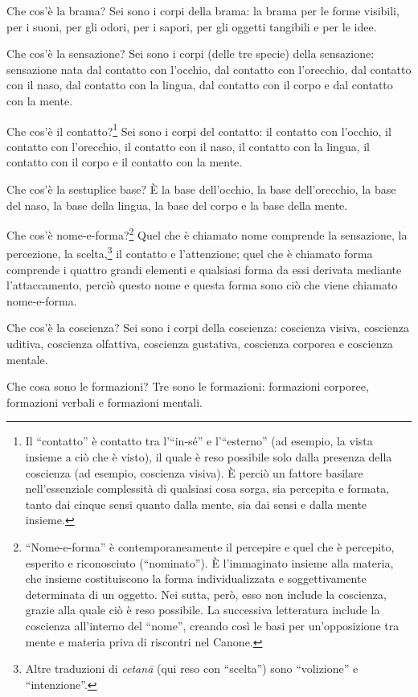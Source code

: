 Che cos’è la brama? Sei sono i corpi della brama: la brama per le forme
visibili, per i suoni, per gli odori, per i sapori, per gli oggetti tangibili e
per le idee.

Che cos’è la sensazione? Sei sono i corpi (delle tre specie) della sensazione:
sensazione nata dal contatto con l’occhio, dal contatto con l’orecchio, dal
contatto con il naso, dal contatto con la lingua, dal contatto con il corpo e
dal contatto con la mente.

Che cos’è il contatto?\footnote{Il “contatto” è contatto tra l’“in-sé” e
  l’“esterno” (ad esempio, la vista insieme a ciò che è visto), il quale è reso
  possibile solo dalla presenza della coscienza (ad esempio, coscienza visiva).
  È perciò un fattore basilare nell’essenziale complessità di qualsiasi cosa
  sorga, sia percepita e formata, tanto dai cinque sensi quanto dalla mente, sia
  dai sensi e dalla mente insieme.} Sei sono i corpi del contatto: il contatto
con l’occhio, il contatto con l’orecchio, il contatto con il naso, il contatto
con la lingua, il contatto con il corpo e il contatto con la mente.

Che cos’è la sestuplice base? È la base dell’occhio, la base dell’orecchio, la
base del naso, la base della lingua, la base del corpo e la base della mente.

Che cos’è nome-e-forma?\footnote{“Nome-e-forma” è contemporaneamente il
  percepire e quel che è percepito, esperito e riconosciuto (“nominato”). È
  l’immaginato insieme alla materia, che insieme costituiscono la forma
  individualizzata e soggettivamente determinata di un oggetto. Nei sutta, però,
  esso non include la coscienza, grazie alla quale ciò è reso possibile. La
  successiva letteratura include la coscienza all’interno del “nome”, creando
  così le basi per un’opposizione tra mente e materia priva di riscontri nel
  Canone.} Quel che è chiamato nome comprende la sensazione, la percezione, la
scelta,\footnote{Altre traduzioni di \emph{cetanā} (qui reso con “scelta”) sono
  “volizione” e “intenzione”.} il contatto e l’attenzione; quel che è chiamato
forma comprende i quattro grandi elementi e qualsiasi forma da essi derivata
mediante l’attaccamento, perciò questo nome e questa forma sono ciò che viene
chiamato nome-e-forma.

Che cos’è la coscienza? Sei sono i corpi della coscienza: coscienza visiva,
coscienza uditiva, coscienza olfattiva, coscienza gustativa, coscienza corporea
e coscienza mentale.

Che cosa sono le formazioni? Tre sono le formazioni: formazioni corporee,
formazioni verbali e formazioni mentali.

